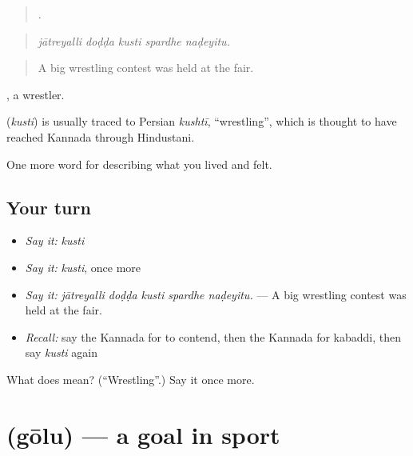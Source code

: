 \begin{quote}
    .
\end{quote}

\begin{quote}
\emph{jātreyalli doḍḍa kusti spardhe naḍeyitu.}
\end{quote}

\begin{quote}
A big wrestling contest was held at the fair.
\end{quote}

, a wrestler.

\begin{cousinweb}
\textbf{} (\emph{kusti}) is usually traced to Persian \emph{kushtī}, \textquotedblleft{}wrestling\textquotedblright{}, which is thought to have reached Kannada through Hindustani.
\end{cousinweb}

\begin{grammarlens}[title={What you've built}]
One more word for describing what you lived and felt.
\end{grammarlens}

\subsection*{Your turn}
\begin{itemize}
\raggedright
  \item \emph{Say it:} \emph{kusti}
  \item \emph{Say it:} \emph{kusti}, once more
  \item \emph{Say it:} \emph{jātreyalli doḍḍa kusti spardhe naḍeyitu.} — A big wrestling contest was held at the fair.
  \item \emph{Recall:} say the Kannada for to contend, then the Kannada for kabaddi, then say \emph{kusti} again
\end{itemize}

\begin{tcolorbox}[breakable,colback=teal!4,colframe=teal!35!black,title={Before you move on}]
What does  mean? (\textquotedblleft{}Wrestling\textquotedblright{}.) Say it once more.
\end{tcolorbox}
\section[\texorpdfstring{\kn{ಗೋಲು} (gōlu)}{ಗೋಲು (gōlu)}]{ (gōlu) — a goal in sport}


